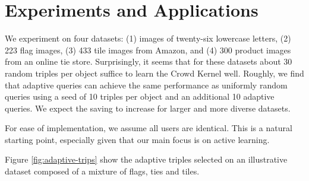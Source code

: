 \documentclass{article}
\begin{document}
\section{Experiments and Applications}


We experiment on four datasets: (1) images of twenty-six lowercase
letters, (2) 223 flag images, (3) 433 tile images from Amazon, and (4)
300 product images from an online tie store. Surprisingly, it seems
that for these datasets about 30 random triples per object suffice to
learn the Crowd Kernel well. Roughly, we find that adaptive queries
can achieve the same performance as uniformly random queries using a
seed of 10 triples per object and an additional 10 adaptive
queries. We expect the saving to increase for larger and more diverse
datasets.

For ease of implementation, we assume all users are identical.  This
is a natural starting point, especially given that our main focus is
on active learning.

Figure \ref{fig:adaptive-trips} show the adaptive triples selected on
an illustrative dataset composed of a mixture of flags, ties and
tiles.
\end{document}

